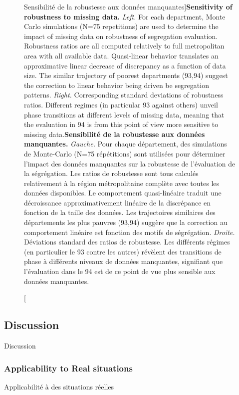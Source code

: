 \begin{figure}
\caption[Sensitivity of robustness to missing data][Sensibilité de la robustesse aux données manquantes]{\textbf{Sensitivity of robustness to missing data.} \textit{Left.} For each department, Monte Carlo simulations (N=75 repetitions) are used to determine the impact of missing data on robustness of segregation evaluation. Robustness ratios are all computed relatively to full metropolitan area with all available data. Quasi-linear behavior translates an approximative linear decrease of discrepancy as a function of data size. The similar trajectory of poorest departments (93,94) suggest the correction to linear behavior being driven be segregation patterns. \textit{Right.} Corresponding standard deviations of robustness ratios. Different regimes (in particular 93 against others) unveil phase transitions at different levels of missing data, meaning that the evaluation in 94 is from this point of view more sensitive to missing data.}{\textbf{Sensibilité de la robustesse aux données manquantes.} \textit{Gauche.} Pour chaque département, des simulations de Monte-Carlo (N=75 répétitions) sont utilisées pour déterminer l'impact des données manquantes sur la robustesse de l'évaluation de la ségrégation. Les ratios de robustesse sont tous calculés relativement à la région métropolitaine complète avec toutes les données disponibles. Le comportement quasi-linéaire traduit une décroissance approximativement linéaire de la discrépance en fonction de la taille des données. Les trajectoires similaires des départements les plus pauvres (93,94) suggère que la correction au comportement linéaire est fonction des motifs de ségrégation. \textit{Droite.} Déviations standard des ratios de robustesse. Les différents régimes (en particulier le 93 contre les autres) révèlent des transitions de phase à différents niveaux de données manquantes, signifiant que l'évaluation dans le 94 est de ce point de vue plus sensible aux données manquantes.}
\label{fig:robustness:sensitivity}
\end{figure}





\subsection{Discussion}{Discussion}


\subsubsection{Applicability to Real situations}{Applicabilité à des situations réelles}


